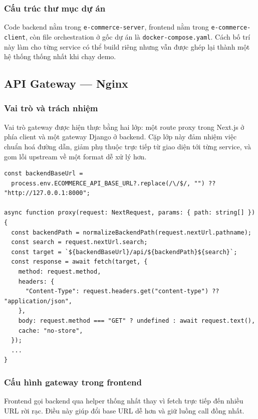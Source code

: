 \documentclass[12pt,a4paper]{article}
\begin{document}
\subsubsection{Cấu trúc thư mục dự án}
Code backend nằm trong \texttt{e-commerce-server}, frontend nằm trong \texttt{e-commerce-client}, còn file orchestration ở gốc dự án là \texttt{docker-compose.yaml}. Cách bố trí này làm cho từng service có thể build riêng nhưng vẫn được ghép lại thành một hệ thống thống nhất khi chạy demo.

\subsection{API Gateway --- Nginx}
\subsubsection{Vai trò và trách nhiệm}
Vai trò gateway được hiện thực bằng hai lớp: một route proxy trong Next.js ở phía client và một gateway Django ở backend. Cặp lớp này đảm nhiệm việc chuẩn hoá đường dẫn, giảm phụ thuộc trực tiếp từ giao diện tới từng service, và gom lỗi upstream về một format dễ xử lý hơn.

\begin{lstlisting}[style=code,caption={Next.js proxy route chuyển request sang backend}]
const backendBaseUrl =
  process.env.ECOMMERCE_API_BASE_URL?.replace(/\/$/, "") ?? "http://127.0.0.1:8000";

async function proxy(request: NextRequest, params: { path: string[] }) {
  const backendPath = normalizeBackendPath(request.nextUrl.pathname);
  const search = request.nextUrl.search;
  const target = `${backendBaseUrl}/api/${backendPath}${search}`;
  const response = await fetch(target, {
    method: request.method,
    headers: {
      "Content-Type": request.headers.get("content-type") ?? "application/json",
    },
    body: request.method === "GET" ? undefined : await request.text(),
    cache: "no-store",
  });
  ...
}
\end{lstlisting}

\subsubsection{Cấu hình gateway trong frontend}
Frontend gọi backend qua helper thống nhất thay vì fetch trực tiếp đến nhiều URL rời rạc. Điều này giúp đổi base URL dễ hơn và giữ luồng call đồng nhất.
\end{document}
